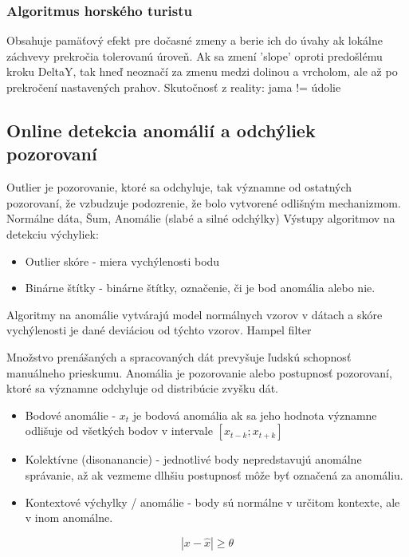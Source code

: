 \subsubsection{Algoritmus horského turistu}
Obsahuje pamäťový efekt pre dočasné zmeny a berie ich do úvahy ak lokálne záchvevy prekročia tolerovanú úroveň. Ak sa zmení 'slope' oproti predošlému kroku DeltaY, tak hneď neoznačí za zmenu medzi dolinou a vrcholom, ale až po prekročení nastavených prahov. Skutočnosť z reality: jama != údolie


\subsection{Online detekcia anomálií a odchýliek pozorovaní}
Outlier je pozorovanie, ktoré sa odchyluje, tak významne od ostatných pozorovaní, že vzbudzuje
podozrenie, že bolo vytvorené odlišným mechanizmom. Normálne dáta, Šum, Anomálie (slabé a silné odchýlky)
Výstupy algoritmov na detekciu výchyliek: 
\begin{itemize}
\itemsep0pt
\item Outlier skóre - miera vychýlenosti bodu
\item Binárne štítky - binárne štítky, označenie, či je bod anomália alebo nie.
\end{itemize}
Algoritmy na anomálie vytvárajú model normálnych vzorov v dátach a skóre vychýlenosti je dané deviáciou od týchto vzorov.
\cite{outlier-analysis} 
Hampel filter

\cite{survey-univariate-time-series} 
Množstvo prenášaných a spracovaných dát prevyšuje ľudskú schopnosť manuálneho prieskumu. Anomália je pozorovanie alebo postupnosť pozorovaní, ktoré sa významne odchyluje od distribúcie zvyšku dát. 
\begin{itemize}
	\item Bodové anomálie - $x_t$ je bodová anomália ak sa jeho hodnota významne odlišuje od všetkých 		
		bodov v intervale $ [x_{t-k}; x_{t+k}] $
	\item Kolektívne (disonanancie) - jednotlivé body nepredstavujú anomálne správanie, až ak vezmeme dlhšiu postupnosť môže byť označená za anomáliu.
	\item Kontextové výchylky / anomálie - body sú normálne v určitom kontexte, ale v inom anomálne.
\end{itemize}		

\cite{review-outlier-datection} \cite{anomaly-detection-algorithms}
\begin{equation}
|x - \hat{x}| \geq \theta 
\end{equation}


